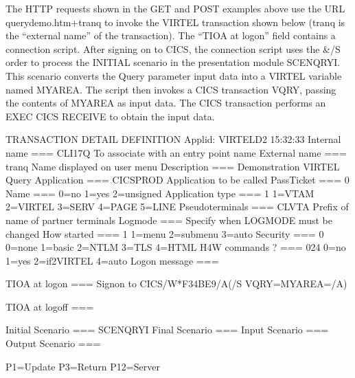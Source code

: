 \documentclass[letterpaper,10pt,english]{sphinxmanual}
\begin{document}
The HTTP requests shown in the GET and POST examples above use the URL querydemo.htm+tranq to invoke the
VIRTEL transaction shown below (tranq is the “external name” of the transaction). The “TIOA at logon” field contains a
connection script. After signing on to CICS, the connection script uses the \&/S order to process the INITIAL scenario in
the presentation module SCENQRYI. This scenario converts the Query parameter input data into a VIRTEL variable
named MYAREA. The script then invokes a CICS transaction VQRY, passing the contents of MYAREA as input data. The
CICS transaction performs an EXEC CICS RECEIVE to obtain the input data.
\label{\detokenize{User_Guide:virt457ug-transaction-detail}}
\def\sphinxLiteralBlockLabel{\label{\detokenize{User_Guide:virt457ug-transaction-detail}}}
\begin{sphinxVerbatim}[commandchars=\\\{\}]
TRANSACTION DETAIL DEFINITION \PYGZhy{}\PYGZhy{}\PYGZhy{}\PYGZhy{}\PYGZhy{}\PYGZhy{}\PYGZhy{}\PYGZhy{}\PYGZhy{}\PYGZhy{}\PYGZhy{}\PYGZhy{}\PYGZhy{}\PYGZhy{}\PYGZhy{}\PYGZhy{}\PYGZhy{}\PYGZhy{}\PYGZhy{}\PYGZhy{}\PYGZhy{}\PYGZhy{} Applid: VIRTELD2 15:32:33
Internal name    ===\PYGZgt{} CLI\PYGZhy{}17Q             To associate with an entry point name
External name    ===\PYGZgt{} tranq               Name displayed on user menu
Description      ===\PYGZgt{} Demonstration VIRTEL Query
Application      ===\PYGZgt{} CICSPROD            Application to be called
PassTicket       ===\PYGZgt{} 0 Name ===\PYGZgt{}         0=no 1=yes 2=unsigned
Application type ===\PYGZgt{} 1                   1=VTAM 2=VIRTEL 3=SERV 4=PAGE 5=LINE
Pseudo\PYGZhy{}terminals ===\PYGZgt{} CLVTA               Prefix of name of partner terminals
Logmode ===\PYGZgt{}                              Specify when LOGMODE must be changed
How started ===\PYGZgt{} 1                        1=menu 2=sub\PYGZhy{}menu 3=auto
Security ===\PYGZgt{} 0                           0=none 1=basic 2=NTLM 3=TLS 4=HTML
H4W commands ? ===\PYGZgt{} 024                   0=no 1=yes 2=if2VIRTEL 4=auto
Logon message ===\PYGZgt{}

TIOA at logon ===\PYGZgt{} Signon to CICS\PYGZam{}/W\PYGZam{}*F34BE9\PYGZam{}/A\PYGZam{}(\PYGZam{}/S VQRY\PYGZam{}=MYAREA=\PYGZam{}/A\PYGZam{})

TIOA at logoff ===\PYGZgt{}

Initial Scenario ===\PYGZgt{} SCENQRYI            Final Scenario ===\PYGZgt{}
Input Scenario ===\PYGZgt{}                       Output Scenario ===\PYGZgt{}

P1=Update                          P3=Return                        P12=Server
\end{sphinxVerbatim}
\let\sphinxLiteralBlockLabel\empty
\end{document}
